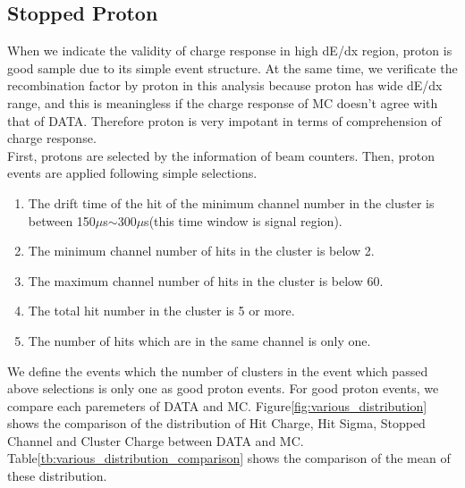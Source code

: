 \subsection{Stopped Proton}

When we indicate the validity of charge response in high dE/dx region, proton is good sample due to its simple event structure.
At the same time, we verificate the recombination factor by proton in this analysis because proton has wide dE/dx range, and this is meaningless if the charge response of MC doesn't agree with that of DATA.
Therefore proton is very impotant in terms of comprehension of charge response.\\

First, protons are selected by the information of beam counters.
Then, proton events are applied following simple selections.\\

\begin{enumerate}
\item The drift time of the hit of the minimum channel number in the cluster is between 150$\mu$s$\sim$300$\mu$s(this time window is signal region). \\
\item The minimum channel number of hits in the cluster is below 2. \\
\item The maximum channel number of hits in the cluster is below 60. \\
\item The total hit number in the cluster is 5 or more. \\
\item The number of hits which are in the same channel is only one. \\
\end{enumerate}

We define the events which the number of clusters in the event which passed above selections is only one as good proton events.
For good proton events, we compare each paremeters of DATA and MC.
Figure\ref{fig:various_distribution} shows the comparison of the distribution of Hit Charge, Hit Sigma, Stopped Channel and  Cluster Charge between DATA and MC.
Table\ref{tb:various_distribution_comparison} shows the comparison of the mean of these distribution.

